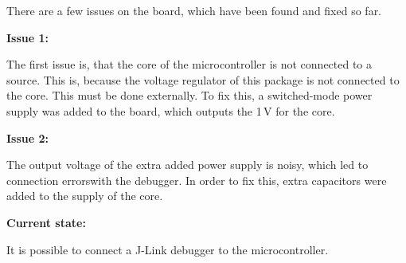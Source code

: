 There are a few issues on the board, which have been found and fixed so far.

\textbf{Issue 1:}

The first issue is, that the core of the microcontroller is not connected to a source. This is, because
the voltage regulator of this package is not connected to the core. This must be done 
externally. To fix this, a switched-mode power supply was added to the board, which outputs the 1\,V
for the core.

\textbf{Issue 2:}

The output voltage of the extra added power supply is noisy, which led to connection errorswith the debugger.
In order to fix this, extra capacitors were added to the supply of the core.

\textbf{Current state:}

It is possible to connect a J-Link debugger to the microcontroller.
